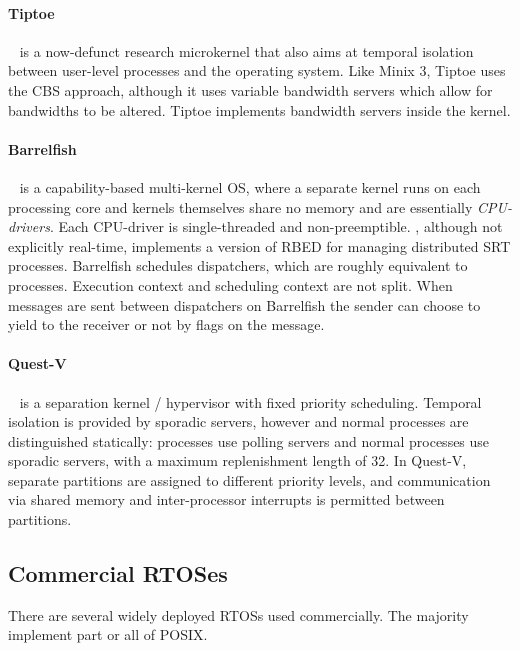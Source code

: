 \paragraph{Tiptoe}~\citep{Craciunas_KPRS_09} is a now-defunct research microkernel that also aims at
temporal isolation between user-level processes and the operating system.  Like {\sc Minix 3},
Tiptoe uses the \gls{CBS} approach, although it uses variable bandwidth servers which allow for
bandwidths to be altered.  Tiptoe implements bandwidth servers inside the kernel.

\paragraph{Barrelfish}~\citep{Peter_SBBIHR_10} is a capability-based multi-kernel \gls{OS}, where a separate kernel runs on each processing core and kernels themselves share no memory and are essentially \emph{\gls{CPU}-drivers}.
Each CPU-driver is single-threaded and non-preemptible. 
 , although not explicitly real-time, implements a version of \gls{RBED} for managing distributed \gls{SRT} processes.
Barrelfish schedules dispatchers, which are roughly equivalent to processes. 
Execution context and scheduling context are not split.
When messages are sent between dispatchers on Barrelfish the sender can choose to yield to the receiver or not by flags on the message.

\paragraph{Quest-V}~\citep{Danish_LW_11} is a separation kernel / hypervisor with fixed priority
scheduling.  Temporal isolation is provided by sporadic servers, however \IO and normal processes
are distinguished statically: \IO processes use polling servers and normal processes use sporadic
servers, with a maximum replenishment length of 32. In Quest-V, separate partitions are assigned to
different priority levels, and communication via shared memory and inter-processor interrupts 
is permitted between partitions.

\subsection{Commercial RTOSes}
There are several widely deployed \glspl{RTOS} used commercially.  The majority implement part or
all of \gls{POSIX}.  

